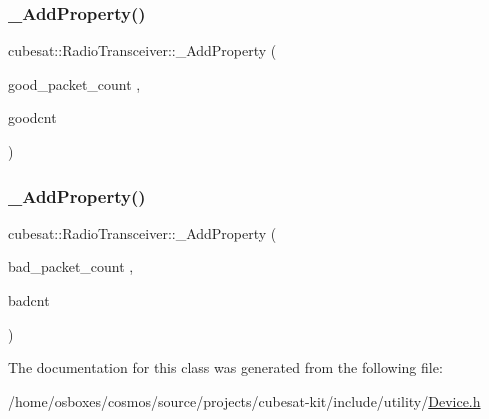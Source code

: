 \mbox{\label{classcubesat_1_1RadioTransceiver_a1e06f3051377b0df184021daca19475a}} 
\subsubsection{\texorpdfstring{\+\_\+\+Add\+Property()}{\_AddProperty()}\hspace{0.1cm}{\footnotesize\ttfamily [14/15]}}
{\footnotesize\ttfamily cubesat\+::\+Radio\+Transceiver\+::\+\_\+\+Add\+Property (\begin{DoxyParamCaption}\item[{good\+\_\+packet\+\_\+count}]{,  }\item[{goodcnt}]{ }\end{DoxyParamCaption})}

\mbox{\label{classcubesat_1_1RadioTransceiver_adae4d603a281ba18f4fd0f7583f43371}} 
\subsubsection{\texorpdfstring{\+\_\+\+Add\+Property()}{\_AddProperty()}\hspace{0.1cm}{\footnotesize\ttfamily [15/15]}}
{\footnotesize\ttfamily cubesat\+::\+Radio\+Transceiver\+::\+\_\+\+Add\+Property (\begin{DoxyParamCaption}\item[{bad\+\_\+packet\+\_\+count}]{,  }\item[{badcnt}]{ }\end{DoxyParamCaption})}



The documentation for this class was generated from the following file\+:\begin{DoxyCompactItemize}
\item 
/home/osboxes/cosmos/source/projects/cubesat-\/kit/include/utility/\hyperlink{Device_8h}{Device.\+h}\end{DoxyCompactItemize}
